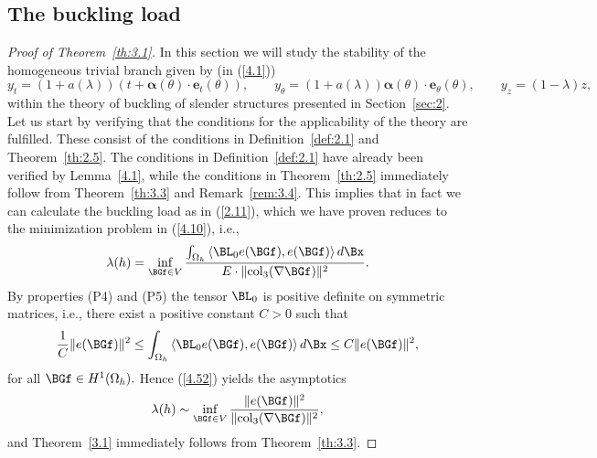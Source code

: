 







\subsection{The buckling load}
\label{sec:4.4}


\begin{proof}[Proof of Theorem~\ref{th:3.1}] 
In this section we will study the stability of the homogeneous trivial branch given by (in (\ref{4.1}))
\begin{equation}
\label{4.54}
y_t=(1+a(\lambda))(t+\bm\alpha(\theta)\cdot \bm e_t(\theta)), \qquad y_\theta=(1+a(\lambda))\bm\alpha(\theta)\cdot \bm e_\theta(\theta), \qquad y_z=(1-\lambda)z, 
\end{equation}
within the theory of buckling of slender structures presented in Section~\ref{sec:2}. Let us start by verifying that the conditions for the applicability of the theory are fulfilled. These consist of the conditions in Definition~\ref{def:2.1} and Theorem~\ref{th:2.5}. The conditions in Definition~\ref{def:2.1} have already been verified by 
Lemma~\ref{4.1}, while the conditions in Theorem~\ref{th:2.5} immediately follow from Theorem~\ref{th:3.3} and Remark~\ref{rem:3.4}. This implies that in fact we can 
calculate the buckling load as in (\ref{2.11}), which we have proven reduces to the minimization problem in (\ref{4.10}), i.e., 
\begin{equation}
\label{4.55}
\Gl(h)=\inf_{\BGf\in V} \frac{\int_{\Omega_h} \left\langle \BL_{0} e(\BGf), e(\BGf)\right\rangle d\Bx}{E\cdot \|\mathrm{col}_3(\nabla\BGf)\|^{2}}.
\end{equation}
By properties (P4) and (P5) the tensor $\BL_0$ is positive definite on symmetric matrices, i.e., there exist a positive constant $C>0$ such that 
$$\frac{1}{C}\|e(\BGf)\|^2\leq \int_{\Omega_h} \left\langle \BL_{0} e(\BGf), e(\BGf)\right\rangle d\Bx \leq C\|e(\BGf)\|^2,$$
for all $\BGf\in H^1(\Omega_h).$ Hence (\ref{4.52}) yields the asymptotics 
\begin{equation}
\label{4.56}
\Gl(h)\sim \inf_{\BGf\in V} \frac{\|e(\BGf)\|^2}{\|\mathrm{col}_3(\nabla\BGf)\|^{2}}, 
\end{equation}
and Theorem~\ref{3.1} immediately follows from Theorem~\ref{th:3.3}. 

\end{proof}




